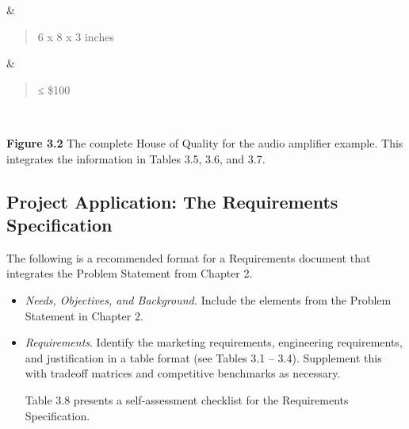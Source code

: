 \begin{longtable}[]
\begin{minipage}[t]{\linewidth}
\begin{quote}
\end{quote}
\end{minipage} & \begin{minipage}[t]{\linewidth}\raggedright
\begin{quote}
6 x 8 x 3 inches
\end{quote}
\end{minipage} & \begin{minipage}[t]{\linewidth}\raggedright
\begin{quote}
≤ \$100
\end{quote}
\end{minipage} \\
\end{longtable}

\textbf{Figure 3.2} The complete House of Quality for the audio
amplifier example. This integrates the information in Tables 3.5, 3.6,
and 3.7.

\subsection{Project Application: The Requirements
Specification}\label{project-application-the-requirements-specification}

The following is a recommended format for a Requirements document that
integrates the Problem Statement from Chapter 2.

\begin{itemize}
\item
  \emph{Needs, Objectives, and Background.} Include the elements from
  the Problem Statement in Chapter 2.
\item
  \emph{Requirements}. Identify the marketing requirements, engineering
  requirements, and justification in a table format (see Tables 3.1 --
  3.4). Supplement this with tradeoff matrices and competitive
  benchmarks as necessary.

  Table 3.8 presents a self-assessment checklist for the Requirements
  Specification.
\end{itemize}

